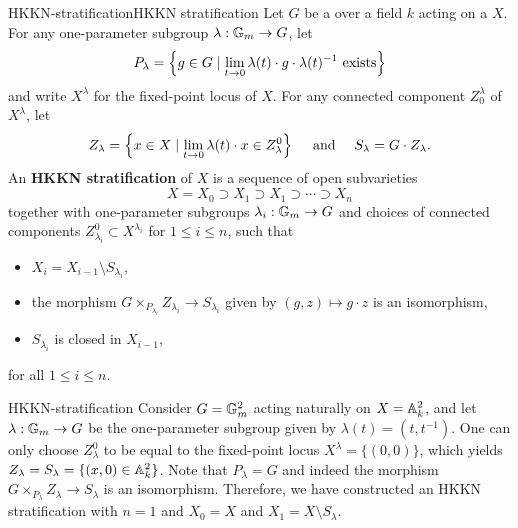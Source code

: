 \begin{topic}{HKKN-stratification}{HKKN stratification}
    Let $G$ be a   over a field $k$ acting on a  $X$. For any one-parameter subgroup $\lambda : \GG_m \to G$, let
    \[ P_\lambda = \left\{ g \in G \mid \lim_{t \to 0} \lambda(t) \cdot g \cdot \lambda(t)^{-1} \textup{ exists} \right\} \]
    and write $X^\lambda$ for the fixed-point locus of $X$. For any connected component $Z_0^\lambda$ of $X^\lambda$, let
    \[ Z_\lambda = \left\{ x \in X \mid \lim_{t \to 0} \lambda(t) \cdot x \in Z_\lambda^0 \right\} \quad \textup{ and } \quad S_\lambda = G \cdot Z_\lambda . \]
    An \textbf{HKKN stratification} of $X$ is a sequence of open subvarieties
    \[ X = X_0 \supset X_1 \supset X_1 \supset \cdots \supset X_n \]
    together with one-parameter subgroups $\lambda_i : \GG_m \to G$ and choices of connected components $Z_{\lambda_i}^0 \subset X^{\lambda_i}$ for $1 \le i \le n$, such that
    \begin{itemize}
        \item $X_i = X_{i - 1} \setminus S_{\lambda_i}$,
        \item the morphism $G \times_{P_{\lambda_i}} Z_{\lambda_i} \to S_{\lambda_i}$ given by $(g, z) \mapsto g \cdot z$ is an isomorphism,
        \item $S_{\lambda_i}$ is closed in $X_{i - 1}$,
    \end{itemize}
    for all $1 \le i \le n$.
\end{topic}

\begin{example}{HKKN-stratification}
    Consider $G = \GG_m^2$ acting naturally on $X = \AA^2_k$, and let $\lambda : \GG_m \to G$ be the one-parameter subgroup given by $\lambda(t) = (t, t^{-1})$. One can only choose $Z_\lambda^0$ to be equal to the fixed-point locus $X^\lambda = \{ (0, 0) \}$, which yields $Z_\lambda = S_\lambda = \{ (x, 0) \in \AA^2_k \}$. Note that $P_\lambda = G$ and indeed the morphism $G \times_{P_\lambda} Z_\lambda \to S_\lambda$ is an isomorphism.
    Therefore, we have constructed an HKKN stratification with $n = 1$ and $X_0 = X$ and $X_1 = X \setminus S_\lambda$.
\end{example}
